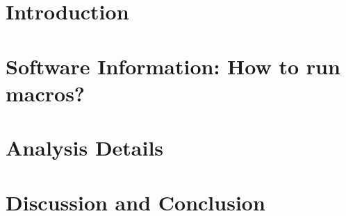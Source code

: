 \documentclass[12pt, letterpaper]{article}
\begin{document}


\newpage
\tableofcontents
\newpage
\listoftables
\listoffigures
\newpage


\section{Introduction}

\section{Software Information: How to run macros?}

\section{Analysis Details}

\section{Discussion and Conclusion}

\newpage

%
\end{document}
